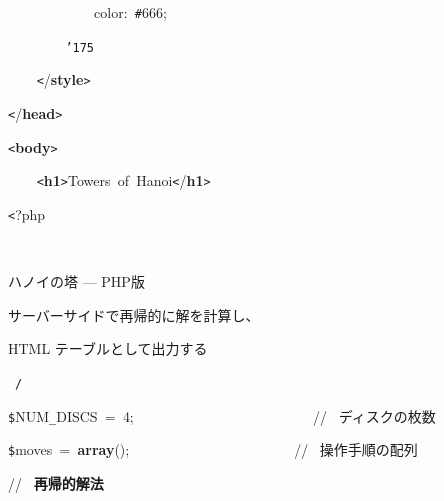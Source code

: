 \documentclass[a4paper,10pt]{article}
\def\mc{\relax}
\begin{document}
\noindent
\mbox{}{\tt\mc \ }{\tt\mc \ }{\tt\mc \ }{\tt\mc \ }{\tt\mc \ }{\tt\mc \ }{\tt\mc \ }{\tt\mc \ }{\tt\mc \ }{\tt\mc \ }{\tt\mc \ }{\tt\mc \ }color:{\tt\mc \ }{\tt\#}666;

\noindent
\mbox{}{\tt\mc \ }{\tt\mc \ }{\tt\mc \ }{\tt\mc \ }{\tt\mc \ }{\tt\mc \ }{\tt\mc \ }{\tt\mc \ }{\tt\char'175}

\noindent
\mbox{}{\tt\mc \ }{\tt\mc \ }{\tt\mc \ }{\tt\mc \ }{\tt <}/\textbf{style}{\tt >}

\noindent
\mbox{}{\tt <}/\textbf{head}{\tt >}

\noindent
\mbox{}{\tt <}\textbf{body}{\tt >}

\noindent
\mbox{}{\tt\mc \ }{\tt\mc \ }{\tt\mc \ }{\tt\mc \ }{\tt <}\textbf{h1}{\tt >}Towers{\tt\mc \ }of{\tt\mc \ }Hanoi{\tt <}/\textbf{h1}{\tt >}

\noindent
\mbox{}\hfill

\noindent
\mbox{}{\tt <}?php

\noindent
\mbox{}\rm\mc {\tt /}{\tt *}\ {\tt *}
\tt\mc 

\noindent
\mbox{}\rm\mc {\tt\mc \ }{\tt *} ハノイの塔 --- PHP版
\tt\mc 

\noindent
\mbox{}\rm\mc {\tt\mc \ }{\tt *} サーバーサイドで再帰的に解を計算し、
\tt\mc 

\noindent
\mbox{}\rm\mc {\tt\mc \ }{\tt *} HTML テーブルとして出力する
\tt\mc 

\noindent
\mbox{}\rm\mc {\tt\mc \ }\rm\mc \ {\tt *}{\tt /}
\tt\mc 

\noindent
\mbox{}\hfill

\noindent
\mbox{}{\tt\$}NUM{\tt\_}DISCS{\tt\mc \ }={\tt\mc \ }4;{\tt\mc \ }{\tt\mc \ }{\tt\mc \ }{\tt\mc \ }{\tt\mc \ }{\tt\mc \ }{\tt\mc \ }{\tt\mc \ }{\tt\mc \ }{\tt\mc \ }{\tt\mc \ }{\tt\mc \ }{\tt\mc \ }{\tt\mc \ }{\tt\mc \ }{\tt\mc \ }{\tt\mc \ }{\tt\mc \ }{\tt\mc \ }{\tt\mc \ }{\tt\mc \ }{\tt\mc \ }{\tt\mc \ }{\tt\mc \ }{\tt\mc \ }\rm\mc // \ ディスクの枚数 \hfill
\tt\mc 

\noindent
\mbox{}{\tt\$}moves{\tt\mc \ }={\tt\mc \ }\textbf{array}();{\tt\mc \ }{\tt\mc \ }{\tt\mc \ }{\tt\mc \ }{\tt\mc \ }{\tt\mc \ }{\tt\mc \ }{\tt\mc \ }{\tt\mc \ }{\tt\mc \ }{\tt\mc \ }{\tt\mc \ }{\tt\mc \ }{\tt\mc \ }{\tt\mc \ }{\tt\mc \ }{\tt\mc \ }{\tt\mc \ }{\tt\mc \ }{\tt\mc \ }{\tt\mc \ }{\tt\mc \ }{\tt\mc \ }\rm\mc // \ 操作手順の配列 \hfill
\tt\mc 

\noindent
\mbox{}\hfill

\noindent
\mbox{}\rm\mc // \ {\bf 再帰的解法} \hfill
\tt\mc 
\end{document}
